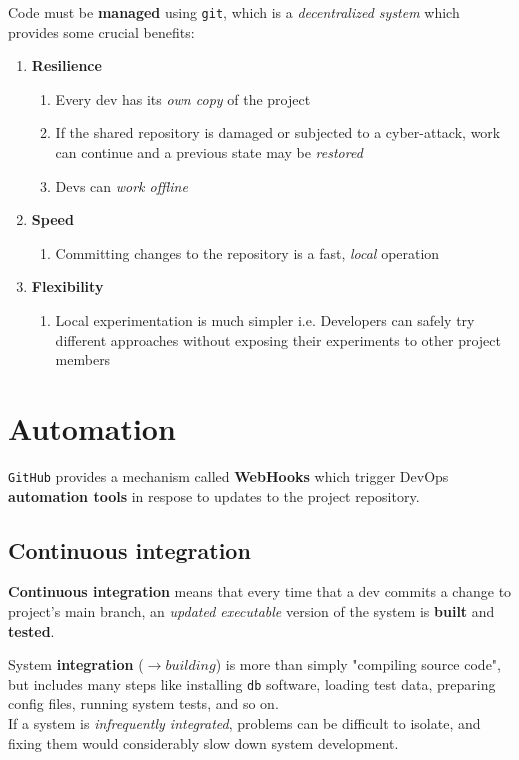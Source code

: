 Code must be \textbf{managed} using \texttt{git}, which is a \textit{decentralized system} which provides some crucial benefits:
\begin{enumerate}
   \item \textbf{Resilience}
   \begin{enumerate}
      \item Every dev has its \textit{own copy} of the project
      \item If the shared repository is damaged or subjected to a cyber-attack, work can continue and a previous state may be \textit{restored}
      \item Devs can \textit{work offline}
   \end{enumerate}
   \item \textbf{Speed}
   \begin{enumerate}
      \item Committing changes to the repository is a fast, \textit{local} operation
   \end{enumerate}
   \item \textbf{Flexibility}
   \begin{enumerate}
      \item Local experimentation is much simpler i.e. 
      Developers can safely try different approaches without exposing their experiments to other project members
   \end{enumerate}
\end{enumerate}

\section{Automation}

\texttt{GitHub} provides a mechanism called \textbf{WebHooks} which trigger DevOps \textbf{automation tools} in respose to updates to the project repository.

\subsection{Continuous integration}
\textbf{Continuous integration} means that every time that a dev commits a change to project's main branch, 
an \textit{updated executable} version of the system is \textbf{built} and \textbf{tested}.

System \textbf{integration} ($\rightarrow building$) is more than simply "compiling source code", but includes many steps like installing \texttt{db} software, loading test data, preparing config files, running system tests, and so on.\\
If a system is \textit{infrequently integrated}, problems can be difficult to isolate, and fixing them would considerably slow down system development.

